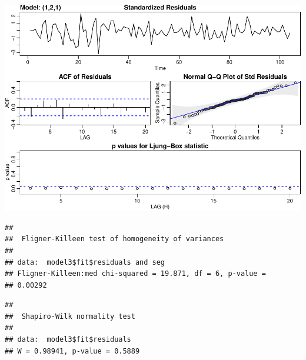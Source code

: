 \documentclass[]{article}
\newenvironment{Shaded}{\begin{snugshade}}{\end{snugshade}}
\newcommand{\DataTypeTok}[1]{\textcolor[rgb]{0.13,0.29,0.53}{#1}}
\newcommand{\DecValTok}[1]{\textcolor[rgb]{0.00,0.00,0.81}{#1}}
\newcommand{\KeywordTok}[1]{\textcolor[rgb]{0.13,0.29,0.53}{\textbf{#1}}}
\newcommand{\NormalTok}[1]{#1}
\newcommand{\OperatorTok}[1]{\textcolor[rgb]{0.81,0.36,0.00}{\textbf{#1}}}
\newcommand{\StringTok}[1]{\textcolor[rgb]{0.31,0.60,0.02}{#1}}
\begin{document}
\begin{center}\includegraphics{bookings_forecast_files/figure-latex/unnamed-chunk-11-1} \end{center}

\begin{Shaded}
\end{Shaded}

\begin{verbatim}
## 
##  Fligner-Killeen test of homogeneity of variances
## 
## data:  model3$fit$residuals and seg
## Fligner-Killeen:med chi-squared = 19.871, df = 6, p-value =
## 0.00292
\end{verbatim}

\begin{Shaded}
\end{Shaded}

\begin{verbatim}
## 
##  Shapiro-Wilk normality test
## 
## data:  model3$fit$residuals
## W = 0.98941, p-value = 0.5889
\end{verbatim}
\end{document}
